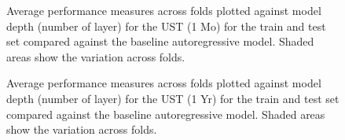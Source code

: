 \documentclass{article}
\theoremstyle{plain}
\theoremstyle{definition}
\theoremstyle{remark}
\begin{document}
\begin{figure}


\caption{\label{fig-ust-1-b}Average performance measures across folds plotted against model depth (number of layer) for the UST (1 Mo) for the train and test set compared against the baseline autoregressive model. Shaded areas show the variation across folds.}

\end{figure}%


\begin{figure}


\caption{\label{fig-ust-1y-b}Average performance measures across folds plotted against model depth (number of layer) for the UST (1 Yr) for the train and test set compared against the baseline autoregressive model. Shaded areas show the variation across folds.}

\end{figure}%
\end{document}
